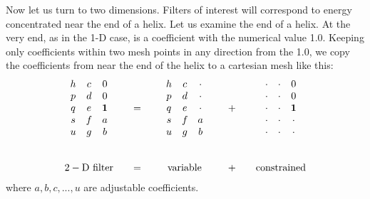 \par
Now let us turn to two dimensions.
Filters of interest will correspond to energy
concentrated near the end of a helix.
Let us examine the end of a helix.
At the very end, as in the 1-D case,
is a coefficient with the numerical value 1.0.
Keeping only coefficients within two mesh points
in any direction from the 1.0,
we copy the coefficients from
near the end of the helix to a cartesian mesh like this:
\begin{equation}
\label{eqn:2dpef}
\begin{array}{ccccc}
        \begin{array}{ccc}
                h  & c &   0 \\
                p  & d &   0 \\
                q  & e &  \bold 1    \\
                s  & f &   a \\
                u  & g &   b
        \end{array}
        &\quad=\quad&
        \begin{array}{ccc}
                h  & c &  \cdot   \\
                p  & d &  \cdot   \\
                q  & e &  \cdot    \\
                s  & f &   a \\
                u  & g &   b
        \end{array}
         &\quad +\quad&
        \begin{array}{ccc}
                \cdot &\cdot &   0 \\
                \cdot &\cdot &   0 \\
                \cdot &\cdot &  \bold 1    \\
                \cdot &\cdot &  \cdot    \\
                \cdot &\cdot &  \cdot  
        \end{array}
  \\
  \\
  \\
        {\rm 2-D \ filter}
           &=&
        {\rm variable}
          &\quad +\quad&
        {\rm constrained}
\end{array}
\end{equation}
where $a,b,c,...,u$ are adjustable coefficients.

